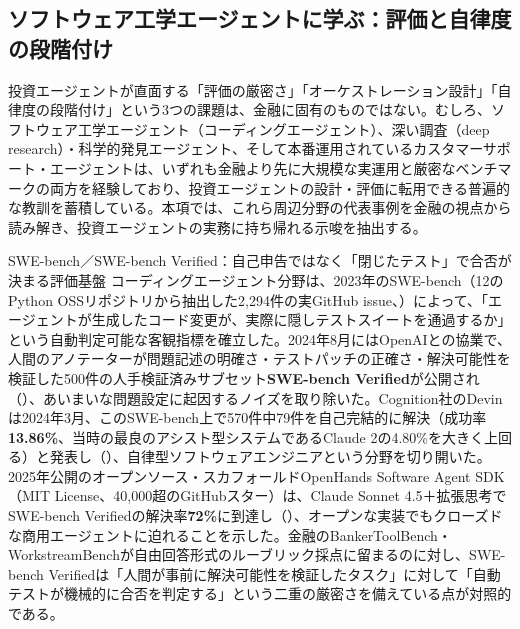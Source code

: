 \subsection{ソフトウェア工学エージェントに学ぶ：評価と自律度の段階付け}
\label{sec:investment-agents-crossdomain}

投資エージェントが直面する「評価の厳密さ」「オーケストレーション設計」「自律度の段階付け」という3つの課題は、金融に固有のものではない。むしろ、ソフトウェア工学エージェント（コーディングエージェント）、深い調査（deep research）・科学的発見エージェント、そして本番運用されているカスタマーサポート・エージェントは、いずれも金融より先に大規模な実運用と厳密なベンチマークの両方を経験しており、投資エージェントの設計・評価に転用できる普遍的な教訓を蓄積している。本項では、これら周辺分野の代表事例を金融の視点から読み解き、投資エージェントの実務に持ち帰れる示唆を抽出する。

\begin{casestudy}{SWE-bench／SWE-bench Verified：自己申告ではなく「閉じたテスト」で合否が決まる評価基盤}
コーディングエージェント分野は、2023年のSWE-bench（12のPython OSSリポジトリから抽出した2,294件の実GitHub issue、\cite{y04swebench2023}）によって、「エージェントが生成したコード変更が、実際に隠しテストスイートを通過するか」という自動判定可能な客観指標を確立した。2024年8月にはOpenAIとの協業で、人間のアノテーターが問題記述の明確さ・テストパッチの正確さ・解決可能性を検証した500件の人手検証済みサブセット\textbf{SWE-bench Verified}が公開され（\cite{y04swebenchverified2024}）、あいまいな問題設定に起因するノイズを取り除いた。Cognition社のDevinは2024年3月、このSWE-bench上で570件中79件を自己完結的に解決（成功率\textbf{13.86\%}、当時の最良のアシスト型システムであるClaude 2の4.80\%を大きく上回る）と発表し（\cite{y04devinintro2024}）、自律型ソフトウェアエンジニアという分野を切り開いた。2025年公開のオープンソース・スカフォールドOpenHands Software Agent SDK（MIT License、40,000超のGitHubスター）は、Claude Sonnet 4.5＋拡張思考でSWE-bench Verifiedの解決率\textbf{72\%}に到達し（\cite{y04openhandssdk2025}）、オープンな実装でもクローズドな商用エージェントに迫れることを示した。金融のBankerToolBench・WorkstreamBenchが自由回答形式のルーブリック採点に留まるのに対し、SWE-bench Verifiedは「人間が事前に解決可能性を検証したタスク」に対して「自動テストが機械的に合否を判定する」という二重の厳密さを備えている点が対照的である。
\end{casestudy}

